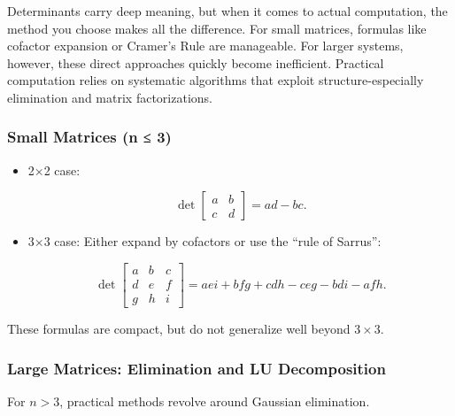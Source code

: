 \documentclass[
  letterpaper,
  DIV=11,
  numbers=noendperiod]{scrreprt}
\begin{document}
Determinants carry deep meaning, but when it comes to actual
computation, the method you choose makes all the difference. For small
matrices, formulas like cofactor expansion or Cramer's Rule are
manageable. For larger systems, however, these direct approaches quickly
become inefficient. Practical computation relies on systematic
algorithms that exploit structure-especially elimination and matrix
factorizations.

\subsubsection{Small Matrices (n ≤ 3)}\label{small-matrices-n-3}

\begin{itemize}
\item
  2×2 case:

  \[
  \det \begin{bmatrix} a & b \\ c & d \end{bmatrix} = ad - bc.
  \]
\item
  3×3 case: Either expand by cofactors or use the ``rule of Sarrus'':

  \[
  \det \begin{bmatrix} 
  a & b & c \\ 
  d & e & f \\ 
  g & h & i 
  \end{bmatrix} = aei + bfg + cdh - ceg - bdi - afh.
  \]
\end{itemize}

These formulas are compact, but do not generalize well beyond
\(3 \times 3\).

\subsubsection{Large Matrices: Elimination and LU
Decomposition}\label{large-matrices-elimination-and-lu-decomposition}

For \(n > 3\), practical methods revolve around Gaussian elimination.
\end{document}
